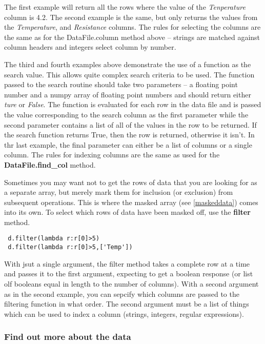 \documentclass[a4paper,11pt]{scrartcl}
\begin{document}
The first example will return all the rows where the value of the
\textit{Tenperature} column is 4.2. The second example is the same, but only
returns the values from the \textit{Temperature}, and \textit{Resistance}
columns. The rules for selecting the columns are the same as for the
DataFile.column method above -- strings are matched against column headers and
integers select column by number.

The third and fourth examples above demonstrate the use of a function as the
search value. This allows quite complex search criteria to be used. The function
passed to the search routine should take two parameters -- a floating point
number and a numpy array of floating point numbers and should return either
\textit{ture} or \textit{False}. The function is evaluated for each row in the
data file and is passed the value corresponding to the search column as the
first parameter while the second parameter contains a list of all of the values
in the row to be returned. If the search function returns True, then the row is
returned, otherwise it isn't. In thr last example, the final parameter can
either be a list of columns or a single column. The rules for indexing columns
are the same as used for the \textbf{DataFile.find\_col} method.

Sometimes you may want not to get the rows of data that you are looking for as a
separate array, but merely mark them for inclusion (or exclusion) from subsequent
operations. This is where the masked array (see \ref{maskeddata}) comes into its own.
To select which rows of data have been masked off, use the \textbf{filter} method.

\begin{lstlisting}
 d.filter(lambda r:r[0]>5)
 d.filter(lambda r:r[0]>5,['Temp'])
\end{lstlisting}

With jsut a single argument, the filter method takes a complete row at a time and passes it
to the first argument, expecting to get a boolean response (or list olf booleans equal in length
to the number of columns). With a second argument as in the second example, you can sepcify which
columns are passed to the filtering function in what order. The second argument must be a list
of things which can be used to index a column (\ie strings, integers, regular expressions).

\subsubsection{Find out more about the data}
\end{document}
